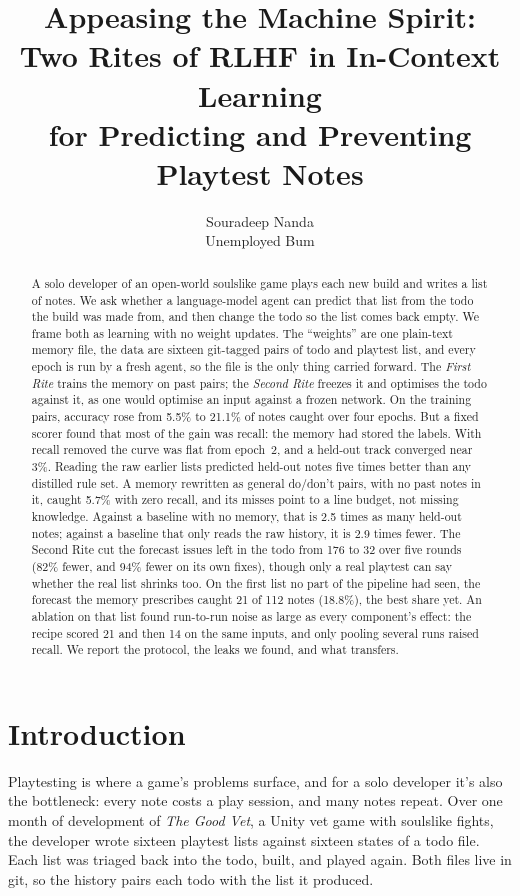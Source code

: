 \documentclass[10pt]{article}
\title{Appeasing the Machine Spirit:\\Two Rites of RLHF in In-Context Learning\\for Predicting and Preventing Playtest Notes}
\author{Souradeep Nanda\\
  \normalfont Unemployed Bum}
\begin{document}
\maketitle

\begin{abstract}
A solo developer of an open-world soulslike game plays each new build and writes a list of notes. We ask whether a language-model agent can predict that list from the todo the build was made from, and then change the todo so the list comes back empty. We frame both as learning with no weight updates. The ``weights'' are one plain-text memory file, the data are sixteen git-tagged pairs of todo and playtest list, and every epoch is run by a fresh agent, so the file is the only thing carried forward. The \emph{First Rite} trains the memory on past pairs; the \emph{Second Rite} freezes it and optimises the todo against it, as one would optimise an input against a frozen network. On the training pairs, accuracy rose from 5.5\% to 21.1\% of notes caught over four epochs. But a fixed scorer found that most of the gain was recall: the memory had stored the labels. With recall removed the curve was flat from epoch~2, and a held-out track converged near 3\%. Reading the raw earlier lists predicted held-out notes five times better than any distilled rule set. A memory rewritten as general do/don't pairs, with no past notes in it, caught 5.7\% with zero recall, and its misses point to a line budget, not missing knowledge. Against a baseline with no memory, that is 2.5 times as many held-out notes; against a baseline that only reads the raw history, it is 2.9 times fewer. The Second Rite cut the forecast issues left in the todo from 176 to 32 over five rounds (82\% fewer, and 94\% fewer on its own fixes), though only a real playtest can say whether the real list shrinks too. On the first list no part of the pipeline had seen, the forecast the memory prescribes caught 21 of 112 notes (18.8\%), the best share yet. An ablation on that list found run-to-run noise as large as every component's effect: the recipe scored 21 and then 14 on the same inputs, and only pooling several runs raised recall. We report the protocol, the leaks we found, and what transfers.
\end{abstract}

\section{Introduction}

Playtesting is where a game's problems surface, and for a solo developer it's also the bottleneck: every note costs a play session, and many notes repeat. Over one month of development of \emph{The Good Vet}, a Unity vet game with soulslike fights, the developer wrote sixteen playtest lists against sixteen states of a todo file. Each list was triaged back into the todo, built, and played again. Both files live in git, so the history pairs each todo with the list it produced.
\end{document}
